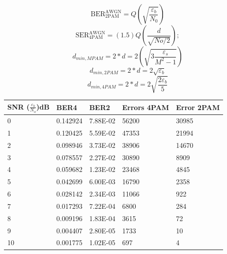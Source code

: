 \documentclass{article}
\begin{document}
\begin{equation}
    \text{BER}_{\text{2PAM}}^{\text{AWGN}} = Q(\sqrt{\frac{\varepsilon_{b}}{N_0}})
\end{equation}
\begin{equation}
    \text{SER}_{\text{4PAM}}^{\text{AWGN}} = (1.5)Q(\frac{d}{\sqrt{No/2}});
\end{equation}
\begin{equation}
   d_{min,MPAM} = 2 * d = 2( \sqrt{3 \frac{\varepsilon_s}{M^2 - 1}})
\end{equation}
\begin{equation}
   d_{min,2PAM} = 2 * d = 2\sqrt{\varepsilon_b}
\end{equation}
\begin{equation}
   d_{min,4PAM} = 2 * d = 2\sqrt{\frac{2\varepsilon_b}{5}}
\end{equation}
\newpage
\begin{center}
\begin{tabular}{|l|l|l|l|l|} \hline
SNR ($\frac{\varepsilon_b}{N_o}$)dB & BER4     & BER2     & Errors 4PAM & Error 2PAM \\ \hline
0   & 0.142924 & 7.88E-02 & 56200       & 30985   \\ \hline
1   & 0.120425 & 5.59E-02 & 47353       & 21994   \\ \hline
2   & 0.098946 & 3.73E-02 & 38906    & 14670   \\ \hline
3   & 0.078557 & 2.27E-02 & 30890    & 8909   \\ \hline
4   & 0.059682 & 1.23E-02 & 23468       & 4845   \\ \hline
5   & 0.042699 & 6.00E-03 & 16790    & 2358   \\ \hline
6   & 0.028142 & 2.34E-03 & 11066       & 922   \\ \hline
7   & 0.017293 & 7.22E-04 & 6800    & 284   \\ \hline
8   & 0.009196 & 1.83E-04 & 3615    & 72   \\ \hline
9   & 0.004407 & 2.80E-05 & 1733    & 10   \\ \hline
10  & 0.001775 & 1.02E-05 & 697    & 4   \\ \hline
\end{tabular}
\end{center}
\newpage
\end{document}
